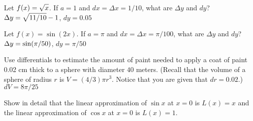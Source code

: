 \exercise Let $\displaystyle f(x) = \sqrt{x}$. If $a=1$ and $dx= \Delta x
=1/10$, what are $\Delta y$ and $dy$?
\answer $\displaystyle \Delta y=\sqrt{11/10}-1$, $dy=0.05$
\endanswer

\endexercise

\exercise Let $f(x) = \sin (2x)$. If $a=\pi$ and $dx= \Delta x
=\pi/100$, what are $\Delta y$ and $dy$?
\answer $\displaystyle \Delta y=\sin(\pi/50)$, $dy=\pi/50$
\endanswer
\endexercise

\exercise Use differentials to estimate the amount of paint needed to
 apply a coat of paint 0.02 cm thick to a sphere with diameter $40$
 meters. (Recall that the volume of a sphere of radius $r$ is $V
 =(4/3)\pi r^3$. Notice that you are given that $dr=0.02$.)
\answer $dV=8\pi/25$
\endanswer
\endexercise

\exercise Show in detail that the linear approximation of
 $\sin x$ at $x=0$ is $L(x)=x$ and the linear approximation of $\cos x$
 at $x=0$ is $L(x)=1$.
\endexercise

\endexercises
